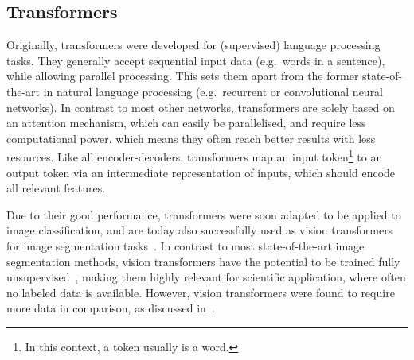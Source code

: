 \subsection{Transformers}
\label{subsec:transformer}
Originally, transformers were developed for (supervised) language processing tasks.
They generally accept sequential input data (e.g.~words in a sentence), while allowing parallel processing.
This sets them apart from the former state-of-the-art in natural language processing (e.g.~recurrent or convolutional neural networks).
In contrast to most other networks, transformers are solely based on an attention mechanism, which can easily be parallelised, and require less computational power, which means they often reach better results with less resources.
Like all encoder-decoders, transformers map an input token\footnote{In this context, a token usually is a word.} to an output token via an intermediate representation of inputs, which should encode all relevant features.~\autocite{Vaswani2017}

Due to their good performance, transformers were soon adapted to be applied to image classification, and are today also successfully used as vision transformers for image segmentation tasks~\autocite{Han2023}.
In contrast to most state-of-the-art image segmentation methods, vision transformers have the potential to be trained fully unsupervised~\autocite{Hamilton2022}, making them highly relevant for scientific application, where often no labeled data is available.
However, vision transformers were found to require more data in comparison, as discussed in~\autocite{Coccomini2021}.

